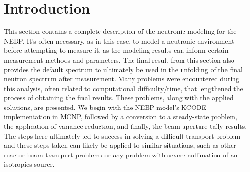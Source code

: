 
\cleardoublepage


\chapter{Introduction}

This section contains a complete description of the neutronic modeling for the NEBP.
It's often necessary, as in this case, to model a neutronic environment before attempting to measure it, as the modeling results can inform certain measurement methods and parameters.
The final result from this section also provides the default spectrum to ultimately be used in the unfolding of the final neutron spectrum after measurement.
Many problems were encountered during this analysis, often related to computational difficulty/time, that lengthened the process of obtaining the final results.
These problems, along with the applied solutions, are presented.
We begin with the NEBP model's KCODE implementation in MCNP, followed by a conversion to a steady-state problem, the application of variance reduction, and finally, the beam-aperture tally results.
The steps here ultimately led to success in solving a difficult transport problem and these steps taken can likely be applied to similar situations, such as other reactor beam transport problems or any problem with severe collimation of an isotropics source.
